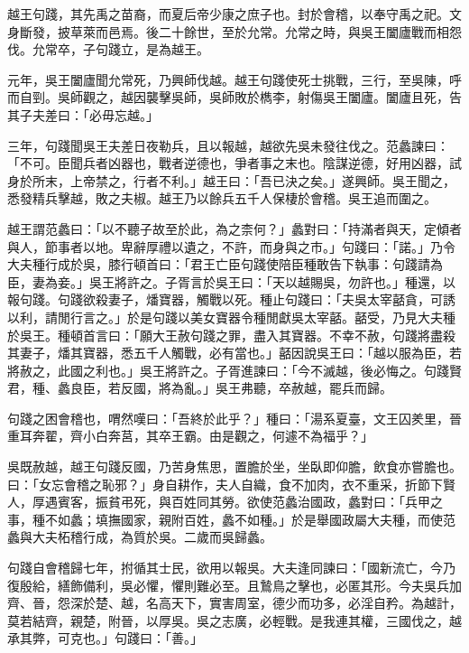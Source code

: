 
\begin{pinyinscope}
越王句踐，其先禹之苗裔，而夏后帝少康之庶子也。封於會稽，以奉守禹之祀。文身斷發，披草萊而邑焉。後二十餘世，至於允常。允常之時，與吳王闔廬戰而相怨伐。允常卒，子句踐立，是為越王。

元年，吳王闔廬聞允常死，乃興師伐越。越王句踐使死士挑戰，三行，至吳陳，呼而自剄。吳師觀之，越因襲擊吳師，吳師敗於檇李，射傷吳王闔廬。闔廬且死，告其子夫差曰：「必毋忘越。」

三年，句踐聞吳王夫差日夜勒兵，且以報越，越欲先吳未發往伐之。范蠡諫曰：「不可。臣聞兵者凶器也，戰者逆德也，爭者事之末也。陰謀逆德，好用凶器，試身於所末，上帝禁之，行者不利。」越王曰：「吾已決之矣。」遂興師。吳王聞之，悉發精兵擊越，敗之夫椒。越王乃以餘兵五千人保棲於會稽。吳王追而圍之。

越王謂范蠡曰：「以不聽子故至於此，為之柰何？」蠡對曰：「持滿者與天，定傾者與人，節事者以地。卑辭厚禮以遺之，不許，而身與之市。」句踐曰：「諾。」乃令大夫種行成於吳，膝行頓首曰：「君王亡臣句踐使陪臣種敢告下執事：句踐請為臣，妻為妾。」吳王將許之。子胥言於吳王曰：「天以越賜吳，勿許也。」種還，以報句踐。句踐欲殺妻子，燔寶器，觸戰以死。種止句踐曰：「夫吳太宰嚭貪，可誘以利，請閒行言之。」於是句踐以美女寶器令種閒獻吳太宰嚭。嚭受，乃見大夫種於吳王。種頓首言曰：「願大王赦句踐之罪，盡入其寶器。不幸不赦，句踐將盡殺其妻子，燔其寶器，悉五千人觸戰，必有當也。」嚭因說吳王曰：「越以服為臣，若將赦之，此國之利也。」吳王將許之。子胥進諫曰：「今不滅越，後必悔之。句踐賢君，種、蠡良臣，若反國，將為亂。」吳王弗聽，卒赦越，罷兵而歸。

句踐之困會稽也，喟然嘆曰：「吾終於此乎？」種曰：「湯系夏臺，文王囚羑里，晉重耳奔翟，齊小白奔莒，其卒王霸。由是觀之，何遽不為福乎？」

吳既赦越，越王句踐反國，乃苦身焦思，置膽於坐，坐臥即仰膽，飲食亦嘗膽也。曰：「女忘會稽之恥邪？」身自耕作，夫人自織，食不加肉，衣不重采，折節下賢人，厚遇賓客，振貧弔死，與百姓同其勞。欲使范蠡治國政，蠡對曰：「兵甲之事，種不如蠡；填撫國家，親附百姓，蠡不如種。」於是舉國政屬大夫種，而使范蠡與大夫柘稽行成，為質於吳。二歲而吳歸蠡。

句踐自會稽歸七年，拊循其士民，欲用以報吳。大夫逢同諫曰：「國新流亡，今乃復殷給，繕飾備利，吳必懼，懼則難必至。且鷙鳥之擊也，必匿其形。今夫吳兵加齊、晉，怨深於楚、越，名高天下，實害周室，德少而功多，必淫自矜。為越計，莫若結齊，親楚，附晉，以厚吳。吳之志廣，必輕戰。是我連其權，三國伐之，越承其弊，可克也。」句踐曰：「善。」


\end{pinyinscope}
